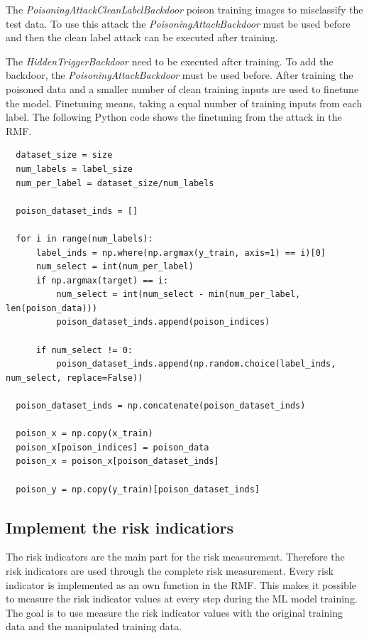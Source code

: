 The \textit{PoisoningAttackCleanLabelBackdoor} poison training images to misclassify the test data. To use this attack the \textit{PoisoningAttackBackdoor} must be used before and then the clean label attack can be executed after training.

The \textit{HiddenTriggerBackdoor} need to be executed after training. To add the backdoor, the \textit{PoisoningAttackBackdoor} must be used before. After training the poisoned data and a smaller number of clean training inputs are used to finetune the model. Finetuning means, taking a equal number of training inputs from each label. The following Python code shows the finetuning from the attack in the RMF.

\begin{lstlisting}
  dataset_size = size
  num_labels = label_size
  num_per_label = dataset_size/num_labels

  poison_dataset_inds = []

  for i in range(num_labels):
      label_inds = np.where(np.argmax(y_train, axis=1) == i)[0]
      num_select = int(num_per_label)
      if np.argmax(target) == i:
          num_select = int(num_select - min(num_per_label, len(poison_data)))
          poison_dataset_inds.append(poison_indices)

      if num_select != 0:
          poison_dataset_inds.append(np.random.choice(label_inds, num_select, replace=False))

  poison_dataset_inds = np.concatenate(poison_dataset_inds)

  poison_x = np.copy(x_train)
  poison_x[poison_indices] = poison_data
  poison_x = poison_x[poison_dataset_inds]

  poison_y = np.copy(y_train)[poison_dataset_inds]
\end{lstlisting}

\subsection{Implement the risk indicatiors}

The risk indicators are the main part for the risk measurement. Therefore the risk indicators are used through the complete risk measurement. Every risk indicator is implemented as an own function in the RMF. This makes it possible to measure the risk indicator values at every step during the ML model training. The goal is to use measure the risk indicator values with the original training data and the manipulated training data.

